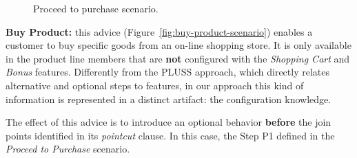 \documentclass{acm_proc_article-sp}
\begin{document}
\begin{figure}[h]
\caption{Proceed to purchase scenario.}
\label{fig:proceed-to-checkout}
\end{figure}

{\bf Buy Product:} this advice (Figure~\ref{fig:buy-product-scenario}) enables a
customer to buy specific goods from an on-line shopping store. It is only
available in the product line members that are {\bf not} configured with the
\emph{Shopping Cart} and \emph{Bonus} features. Differently from the PLUSS
approach, which directly relates alternative and optional steps to features, in
our approach this kind of information is represented in a distinct artifact: the
configuration knowledge.

The effect of this advice is to introduce an optional behavior {\bf
before} the join points identified in its \emph{pointcut} clause. In this case,
the Step P1 defined in the \emph{Proceed to Purchase} scenario.
\end{document}
